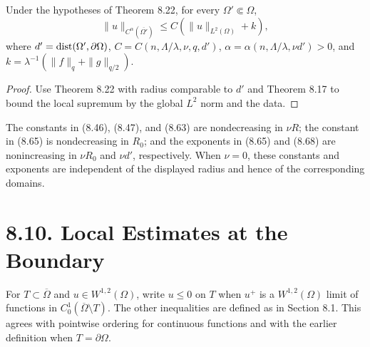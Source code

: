 \begin{theorem}
\label{gt-thm-8-24-interior-holder-norm}
Under the hypotheses of Theorem 8.22, for every $\Omega'\Subset\Omega$,
\begin{equation}
\|u\|_{C^\alpha(\overline{\Omega'})}
\leq C(\|u\|_{L^2(\Omega)}+k),
\tag{8.68}
\end{equation}
where $d'=\operatorname{dist}(\Omega',\partial\Omega)$,
$C=C(n,\Lambda/\lambda,\nu,q,d')$,
$\alpha=\alpha(n,\Lambda/\lambda,\nu d')>0$, and
$k=\lambda^{-1}(\|f\|_q+\|g\|_{q/2})$.
\end{theorem}
\begin{proof}
\sketch Use Theorem 8.22 with radius comparable to $d'$ and Theorem 8.17 to
bound the local supremum by the global $L^2$ norm and the data.
\end{proof}

\begin{remark}
\label{gt-rem-8-local-constant-dependence}
The constants in (8.46), (8.47), and (8.63) are nondecreasing in $\nu R$;
the constant in (8.65) is nondecreasing in $R_0$; and the exponents in
(8.65) and (8.68) are nonincreasing in $\nu R_0$ and $\nu d'$, respectively.
When $\nu=0$, these constants and exponents are independent of the displayed
radius and hence of the corresponding domains.
\end{remark}

\section*{8.10. Local Estimates at the Boundary}

\begin{definition}
\label{gt-def-8-boundary-portion-inequality}
For $T\subset\overline\Omega$ and $u\in W^{1,2}(\Omega)$, write $u\leq0$ on
$T$ when $u^+$ is a $W^{1,2}(\Omega)$ limit of functions in
$C_0^1(\overline\Omega\setminus T)$. The other inequalities are defined as in
Section 8.1. This agrees with pointwise ordering for continuous functions and
with the earlier definition when $T=\partial\Omega$.
\end{definition}

